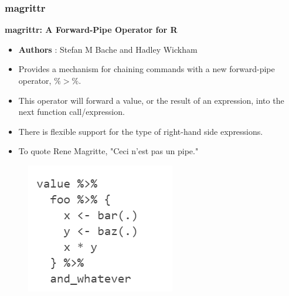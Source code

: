 \documentclass{beamer}
\begin{document}
\begin{frame}
\frametitle{magrittr}
\textbf{magrittr: A Forward-Pipe Operator for R}
\begin{itemize}
	\item \textbf{Authors} : Stefan M Bache and Hadley Wickham
\item Provides a mechanism for chaining commands with a new forward-pipe operator, $\%>\%$. 
\item This operator will forward a value, or the result of an expression, into the next function call/expression. 
\item There is flexible support for the type of right-hand side expressions. \item To quote Rene Magritte, "Ceci n'est pas un pipe."
\end{itemize}

\end{frame}
\begin{frame}
	
	\begin{figure}
\centering
\includegraphics[width=0.99\linewidth]{magrittr}

\end{figure}

\end{frame}
\end{document}
